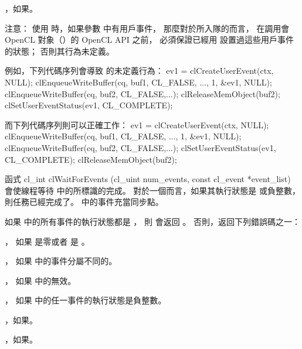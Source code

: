 \item {}，如果\schostfailres。
\stopigBase

注意：
使用  時，如果參數  中有用戶事件，
那麼對於所入隊的而言，
在調用會 OpenCL 對象（）的 OpenCL API 之前，
必須保證已經用  設置過這些用戶事件的狀態；
否則其行為未定義。

例如，下列代碼序列會導致  的未定義行為：
\startCLFUNC
ev1 = clCreateUserEvent(ctx, NULL);
clEnqueueWriteBuffer(cq, buf1, CL_FALSE, ...,
				1, &ev1, NULL);
clEnqueueWriteBuffer(cq, buf2, CL_FALSE,...);
clReleaseMemObject(buf2);
clSetUserEventStatus(ev1, CL_COMPLETE);
\stopCLFUNC

而下列代碼序列則可以正確工作：
\startCLFUNC
ev1 = clCreateUserEvent(ctx, NULL);
clEnqueueWriteBuffer(cq, buf1, CL_FALSE, ...,
				1, &ev1, NULL);
clEnqueueWriteBuffer(cq, buf2, CL_FALSE,...);
clSetUserEventStatus(ev1, CL_COMPLETE);
clReleaseMemObject(buf2);
\stopCLFUNC

函式
\startCLFUNC
cl_int clWaitForEvents (cl_uint num_events,
			const cl_event *event_list)
\stopCLFUNC
會使線程等待  中的所標識的完成。
對於一個而言，如果其執行狀態是  或負整數，則任務已經完成了。
  中的事件充當同步點。

如果  中的所有事件的執行狀態都是 ，
則  會返回 。
否則，返回下列錯誤碼之一：
\startigBase
\item {}，
如果  是零或者  是 。

\item {}，
如果  中的事件分屬不同的。

\item {}，
如果  中的無效。

\item {}，
如果  中的任一事件的執行狀態是負整數。

\item {}，如果\scdevfailres。

\item {}，如果\schostfailres。
\stopigBase


